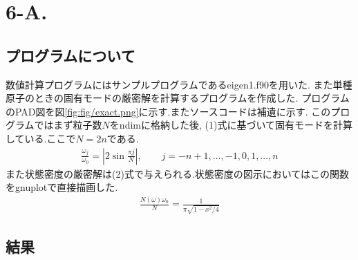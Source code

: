 \section{6-A.}
\subsection{プログラムについて}
数値計算プログラムにはサンプルプログラムであるeigen1.f90を用いた.
また単種原子のときの固有モードの厳密解を計算するプログラムを作成した.
プログラムのPAD図を図\ref{fig:fig/exact.png}に示す.またソースコードは補遺に示す.
このプログラムではまず粒子数$N$をndimに格納した後,
(1)式に基づいて固有モードを計算している.ここで$N=2n$である.
\begin{align}
  \frac{\omega_j}{\omega_0}=\left|2\sin\frac{\pi j}{N}\right|,\qquad j=-n+1,\ldots,-1,0,1,\ldots,n
\end{align}
また状態密度の厳密解は(2)式で与えられる.状態密度の図示においてはこの関数をgnuplotで直接描画した.
\begin{align}
  \frac{N(\omega)\omega_0}{N}=\frac{1}{\pi\sqrt{1-x^2/4}}
\end{align}
\newpage
\subsection{結果}
